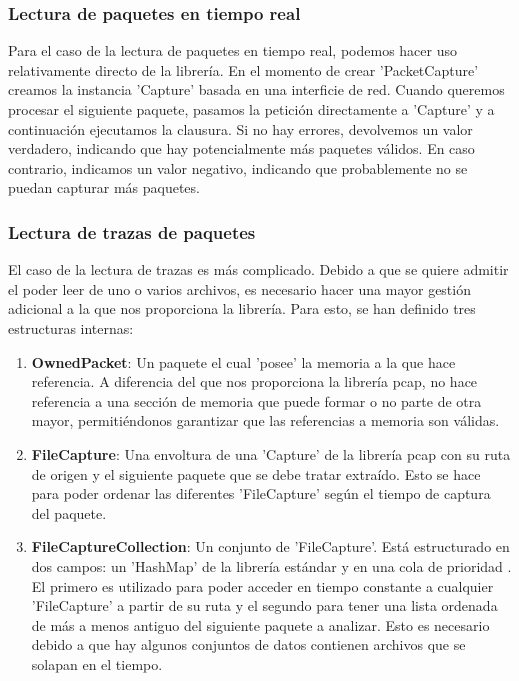 \subsubsection{Lectura de paquetes en tiempo real}

Para el caso de la lectura de paquetes en tiempo real, podemos hacer uso relativamente directo de la librería. En el momento de crear 'PacketCapture' creamos la instancia 'Capture' basada en una interficie de red. Cuando queremos procesar el siguiente paquete, pasamos la petición directamente a 'Capture' y a continuación ejecutamos la clausura. Si no hay errores, devolvemos un valor verdadero, indicando que hay potencialmente más paquetes válidos. En caso contrario, indicamos un valor negativo, indicando que probablemente no se puedan capturar más paquetes.

\subsubsection{Lectura de trazas de paquetes}

El caso de la lectura de trazas es más complicado. Debido a que se quiere admitir el poder leer de uno o varios archivos, es necesario hacer una mayor gestión adicional a la que nos proporciona la librería. Para esto, se han definido tres estructuras internas:
\begin{enumerate}
  \item \textbf{OwnedPacket}: Un paquete el cual 'posee' la memoria a la que hace referencia. A diferencia del que nos proporciona la librería pcap, no hace referencia a una sección de memoria que puede formar o no parte de otra mayor, permitiéndonos garantizar que las referencias a memoria son válidas.
  \item \textbf{FileCapture}: Una envoltura de una 'Capture' de la librería pcap con su ruta de origen y el siguiente paquete que se debe tratar extraído. Esto se hace para poder ordenar las diferentes 'FileCapture' según el tiempo de captura del paquete.
  \item \textbf{FileCaptureCollection}: Un conjunto de 'FileCapture'. Está estructurado en dos campos: un 'HashMap' de la librería estándar y en una cola de prioridad \cite{priority-queue}. El primero es utilizado para poder acceder en tiempo constante a cualquier 'FileCapture' a partir de su ruta y el segundo para tener una lista ordenada de más a menos antiguo del siguiente paquete a analizar. Esto es necesario debido a que hay algunos conjuntos de datos contienen archivos que se solapan en el tiempo.
\end{enumerate}


